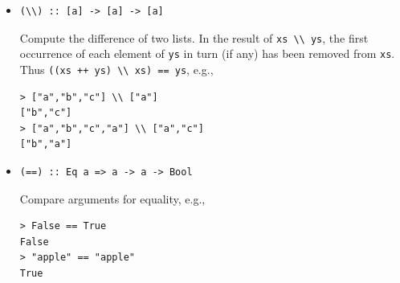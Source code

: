 \documentclass[addpoints]{exam}
\begin{document}
\begin{itemize}
\newpage

\item
\begin{verbatim}
(\\) :: [a] -> [a] -> [a]
\end{verbatim}
Compute the difference of two lists. In the result of \verb|xs \\ ys|, the first occurrence of each element of \texttt{ys} in turn (if any) has been removed from \texttt{xs}.  Thus \verb|((xs ++ ys) \\ xs) == ys|, e.g.,
\begin{verbatim}
> ["a","b","c"] \\ ["a"]
["b","c"]
> ["a","b","c","a"] \\ ["a","c"]
["b","a"]
\end{verbatim}

\item
\begin{verbatim}
(==) :: Eq a => a -> a -> Bool
\end{verbatim}
Compare arguments for equality, e.g., 
\begin{verbatim}
> False == True
False
> "apple" == "apple"
True
\end{verbatim}

\end{itemize}
\end{document}
